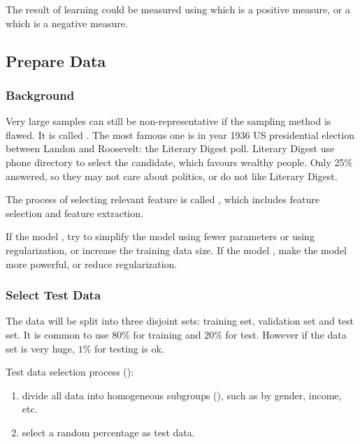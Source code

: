 The result of learning could be measured using  which is a positive measure, or a  which is a negative measure.




\subsection{Prepare Data}

\subsubsection{Background}

Very large samples can still be non-representative if the sampling method is flawed. It is called . The most famous one is in year 1936 US presidential election between Landon and Roosevelt: the Literary Digest poll. Literary Digest use phone directory to select the candidate, which favours wealthy people. Only 25\% answered, so they may not care about politics, or do not like Literary Digest.

The process of selecting relevant feature is called , which includes feature selection and feature extraction.


If the model , try to simplify the model using fewer parameters or using regularization, or increase the training data size. If the model , make the model more powerful, or reduce regularization.




\subsubsection{Select Test Data}

The data will be split into three disjoint sets: training set, validation set and test set. It is common to use $80\%$ for training and $20\%$ for test. However if the data set is very huge, $1\%$ for testing is ok. 

Test data selection process ():
\begin{enumerate}
    \item divide all data into homogeneous subgroups (), such as by gender, income, etc.
    \item select a random percentage as test data.
\end{enumerate}




